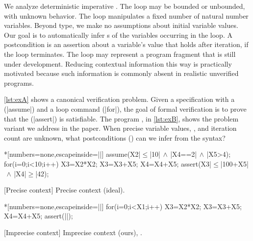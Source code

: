 We analyze deterministic imperative . The loop may be
bounded or unbounded, with unknown  behavior. The loop
manipulates a fixed number of natural number variables. Beyond type, we make no
assumptions about initial variable values. Our goal is to automatically infer
s of the variables occurring in the loop. A postcondition is
an assertion about a variable's value that holds after iteration, if the loop
terminates. The loop may represent a program {fragment} that is still under
development. Reducing contextual information this way is practically motivated
because such information is commonly absent in realistic unverified programs.

\autoref{lst:exA} shows a canonical verification problem.
Given a specification with a  (\pr|assume|) and a loop command
(\pr|for|), the goal of formal verification is to prove that the
 (\pr|assert|) is satisfiable. The program \emph{\explain},
in \autoref{lst:exB}, shows the problem variant we address in the paper. When
precise variable values, , and iteration count are unknown,
what postconditions (\qtext) can we infer from the syntax?

\begin{center}
\begin{minipage}{.45\textwidth}
\captionsetup{type=lstlisting}
\begin{center}
\begin{minipage}{.9\textwidth}
\begin{implisting}*[numbers=none,escapeinside=||]
assume(X2|$\leq$|10|$\,\land\,$|X4==2|$\,\land\,$|X5>4);
for(i=0;i<10;i++) {
  X3=X2*X2;
  X3=X3+X5;
  X4=X4+X5; }
assert(X3|$\leq$|100+X5|$\,\land\,$|X4|$\geq$|42);
\end{implisting}
\end{minipage}
\end{center}
[Precise context]
{Precise context (ideal).}\label{lst:exA}
\end{minipage}\hfill%
\begin{minipage}{.52\textwidth}
\captionsetup{type=lstlisting}
\begin{center}
\begin{minipage}{.85\textwidth}
\begin{implisting}*[numbers=none,escapeinside=||]
for(i=0;i<X1;i++) {
  X3=X2*X2;
  X3=X3+X5;
  X4=X4+X5; }
assert(|\myqm|);
\end{implisting}
\end{minipage}
\end{center}
[Imprecise context]
{Imprecise context (ours), \mbox{\explain}.}\label{lst:exB}
\end{minipage}
\end{center}

